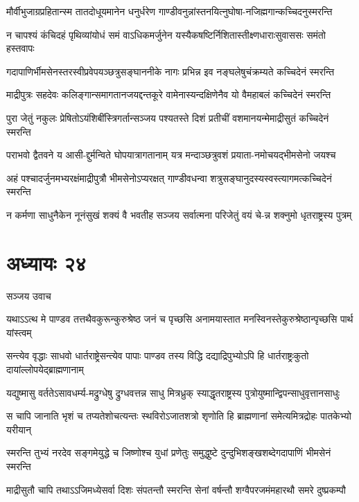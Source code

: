 \twolineshloka
{मौर्वीभुजाग्रप्रहितान्स्म तातदोधूयमानेन धनुर्धरेण}
{गाण्डीवनुन्नांस्तनयित्नुघोषा-नजिह्मगान्कच्चिदनुस्मरन्ति}


\twolineshloka
{न चापश्यं कंचिदहं पृथिव्यांयोधं समं वाऽधिकमर्जुनेन}
{यस्यैकषष्टिर्निशितास्तीक्ष्णधाराःसुवाससः समंतो हस्तवापः}


\twolineshloka
{गदापाणिर्भीमसेनस्तरस्वीप्रवेपयञ्छत्रुसङ्घाननीके}
{नागः प्रभिन्न इव नङ्घलेषुचंक्रम्यते कच्चिदेनं स्मरन्ति}


\twolineshloka
{माद्रीपुत्रः सहदेवः कलिङ्गान्समागतानजयद्दन्तकूरे}
{वामेनास्यन्दक्षिणेनैव यो वैमहाबलं कच्चिदेनं स्मरन्ति}


\twolineshloka
{पुरा जेतुं नकुलः प्रेषितोऽयंशिबींस्त्रिगर्तान्सञ्जय पश्यतस्ते}
{दिशं प्रतीचीं वशमानयन्मेमाद्रीसुतं कच्चिदेनं स्मरन्ति}


\twolineshloka
{पराभवो द्वैतवने य आसी-द्दुर्मन्विते घोपयात्रागतानाम्}
{यत्र मन्दाञ्छत्रुवशं प्रयाता-नमोचयद्भीमसेनो जयश्च}


\twolineshloka
{अहं पश्चादर्जुनमभ्यरक्षंमाद्रीपुत्रौ भीमसेनोऽप्यरक्षत्}
{गाण्डीवधन्वा शत्रुसङ्घानुदस्यस्वस्त्यागमत्कच्चिदेनं स्मरन्ति}


\twolineshloka
{न कर्मणा साधुनैकेन नूनंसुखं शक्यं वै भवतीह सञ्जय}
{सर्वात्मना परिजेतुं वयं चे-न्न शक्नुमो धृतराष्ट्रस्य पुत्रम्}


\chapter{अध्यायः २४}
\twolineshloka
{सञ्जय उवाच}
{}


\twolineshloka
{यथाऽऽत्थ मे पाण्डव तत्तथैवकुरून्कुरुश्रेष्ठ जनं च पृच्छसि}
{अनामयास्तात मनस्विनस्तेकुरुश्रेष्ठान्पृच्छसि पार्थ यांस्त्वम्}


\twolineshloka
{सन्त्येव वृद्धाः साधवो धार्तराष्ट्रेसन्त्येव पापाः पाण्डव तस्य विद्धि}
{दद्याद्रिपुभ्योऽपि हि धार्तराष्ट्रःकुतो दायांल्लोपयेद्ब्राह्मणानाम्}


\twolineshloka
{यद्युष्मासु वर्ततेऽसावधर्म्य-मद्रुग्धेषु द्रुग्धवत्तन्न साधु}
{मित्रध्रुक् स्याद्धृतराष्ट्रस्य पुत्रोयुष्मान्द्विपन्साधुवृत्तानसाधुः}


\twolineshloka
{स चापि जानाति भृशं च तप्यतेशोचत्यन्तः स्थविरोऽजातशत्रो}
{शृणोति हि ब्राह्मणानां समेत्यमित्रद्रोहः पातकेभ्यो यरीयान्}


\twolineshloka
{स्मरन्ति तुभ्यं नरदेव सङ्गमेयुद्धे च जिष्णोश्च युधां प्रणेतुः}
{समुद्धुष्टे दुन्दुभिशङ्खशब्देगदापाणिं भीमसेनं स्मरन्ति}


\twolineshloka
{माद्रीसुतौ चापि तथाऽऽजिमध्येसर्वा दिशः संपतन्तौ स्मरन्ति}
{सेनां वर्षन्तौ शग्वैपरजमंमहारथौ समरे दुष्प्रकम्पौ}


